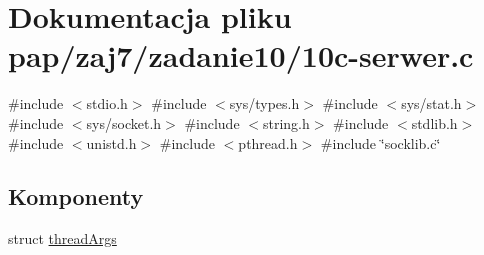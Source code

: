 \hypertarget{10c-serwer_8c}{}\section{Dokumentacja pliku pap/zaj7/zadanie10/10c-\/serwer.c}
\label{10c-serwer_8c}
{\ttfamily \#include $<$stdio.\+h$>$}\newline
{\ttfamily \#include $<$sys/types.\+h$>$}\newline
{\ttfamily \#include $<$sys/stat.\+h$>$}\newline
{\ttfamily \#include $<$sys/socket.\+h$>$}\newline
{\ttfamily \#include $<$string.\+h$>$}\newline
{\ttfamily \#include $<$stdlib.\+h$>$}\newline
{\ttfamily \#include $<$unistd.\+h$>$}\newline
{\ttfamily \#include $<$pthread.\+h$>$}\newline
{\ttfamily \#include \char`\"{}socklib.\+c\char`\"{}}\newline
\subsection*{Komponenty}
\begin{DoxyCompactItemize}
\item 
struct \mbox{\hyperlink{structthreadArgs}{thread\+Args}}
\end{DoxyCompactItemize}
